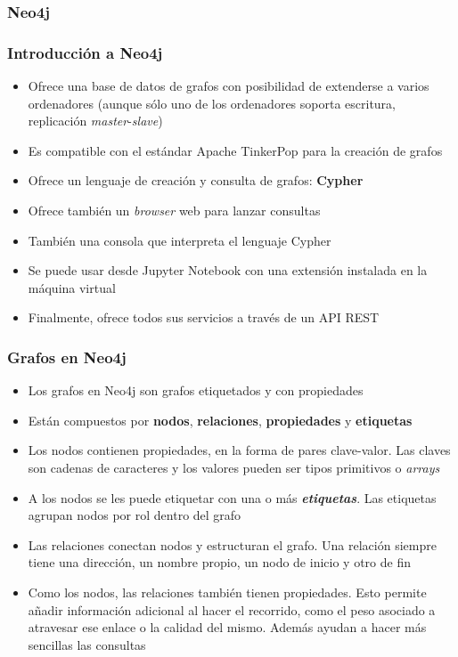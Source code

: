\documentclass[14pt]{beamer}
\begin{document}
\subsubsection{Neo4j}

\begin{frame}
  \frametitle{Introducción a Neo4j}
\begin{itemize}
\item Ofrece una base de datos de grafos con posibilidad de extenderse a
  varios ordenadores (aunque sólo uno de los ordenadores soporta escritura,
  replicación {\em master}-{\em slave})
\item Es compatible con el estándar Apache TinkerPop para la creación de
  grafos
\item Ofrece un lenguaje de creación y consulta de grafos: {\bf Cypher}
\item Ofrece también un {\em browser\/} web para lanzar consultas
\item También una consola que interpreta el lenguaje Cypher
\item Se puede usar desde Jupyter Notebook con una extensión instalada en
  la máquina virtual
\item Finalmente, ofrece todos sus servicios a través de un API REST
  \end{itemize}
\end{frame}

\begin{frame}[allowframebreaks]
  \frametitle{Grafos en Neo4j}
  \begin{itemize}
  \item Los grafos en Neo4j son grafos etiquetados y con propiedades
  \item Están compuestos por {\bf nodos}, {\bf relaciones}, {\bf
      propiedades} y {\bf etiquetas}
\item Los nodos contienen propiedades, en la forma de pares clave-valor.
  Las claves son cadenas de caracteres y los valores pueden ser tipos
  primitivos o {\em arrays}
\item A los nodos se les puede etiquetar con una o más {\bfseries\itshape
    etiquetas}. Las etiquetas agrupan nodos por rol dentro del grafo
\item Las relaciones conectan nodos y estructuran el grafo. Una relación
  siempre tiene una dirección, un nombre propio, un nodo de inicio y otro
  de fin
\item Como los nodos, las relaciones también tienen propiedades. Esto
  permite añadir información adicional al hacer el recorrido, como el peso
  asociado a atravesar ese enlace o la calidad del mismo. Además ayudan a
  hacer más sencillas las consultas
  \end{itemize}
\end{frame}
\end{document}
